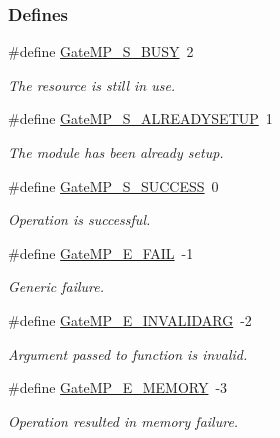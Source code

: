 \subsubsection*{Defines}
\begin{DoxyCompactItemize}
\item 
\#define \hyperlink{_gate_m_p_8h_a78c50bd892ebded475a145ae7bb71f39}{GateMP\_\-S\_\-BUSY}~2
\begin{DoxyCompactList}\small\item\em The resource is still in use. \item\end{DoxyCompactList}\item 
\#define \hyperlink{_gate_m_p_8h_a0f6606bbd36e2e502cbb967cee5bd086}{GateMP\_\-S\_\-ALREADYSETUP}~1
\begin{DoxyCompactList}\small\item\em The module has been already setup. \item\end{DoxyCompactList}\item 
\#define \hyperlink{_gate_m_p_8h_a1ffb641b2f80fe24940f930986cc6dee}{GateMP\_\-S\_\-SUCCESS}~0
\begin{DoxyCompactList}\small\item\em Operation is successful. \item\end{DoxyCompactList}\item 
\#define \hyperlink{_gate_m_p_8h_ac75ff3b36b981b6088d9ec294a36a875}{GateMP\_\-E\_\-FAIL}~-\/1
\begin{DoxyCompactList}\small\item\em Generic failure. \item\end{DoxyCompactList}\item 
\#define \hyperlink{_gate_m_p_8h_acf51ad78ae70ed3674cd379499d40fb9}{GateMP\_\-E\_\-INVALIDARG}~-\/2
\begin{DoxyCompactList}\small\item\em Argument passed to function is invalid. \item\end{DoxyCompactList}\item 
\#define \hyperlink{_gate_m_p_8h_a4565a3a4bdab37b2499fa79177297242}{GateMP\_\-E\_\-MEMORY}~-\/3
\begin{DoxyCompactList}\small\item\em Operation resulted in memory failure. \item\end{DoxyCompactList}\item 

\end{DoxyCompactItemize}
